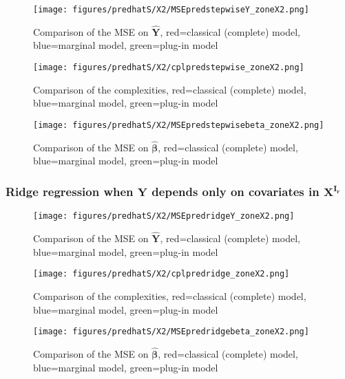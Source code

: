\documentclass[12pt,a4paper]{report}
\begin{document}
	\begin{figure}[h!]
	\centering
		  \texttt{[image: figures/predhatS/X2/MSEpredstepwiseY\_zoneX2.png]}
		\caption{Comparison of the MSE on $\hat{\boldsymbol{Y}}$, red=classical (complete) model, blue=marginal model, green=plug-in model}\label{MSEpredstepwiseY_zoneX2}
	\end{figure}
	\begin{figure}[h!]
	\centering
		  \texttt{[image: figures/predhatS/X2/cplpredstepwise\_zoneX2.png]}
		\caption{Comparison of the complexities, red=classical (complete) model, blue=marginal model, green=plug-in model}\label{cplpredstepwise_zoneX2}
	\end{figure}
	\begin{figure}[h!]
	\centering
		  \texttt{[image: figures/predhatS/X2/MSEpredstepwisebeta\_zoneX2.png]}
		\caption{Comparison of the MSE on $\hat{\boldsymbol{\beta}}$, red=classical (complete) model, blue=marginal model, green=plug-in model}\label{MSEpredstepwisebeta_zoneX2}
	\end{figure}
	\FloatBarrier
\newpage
\subsubsection{Ridge regression when $\boldsymbol{Y}$ depends only on covariates in $\boldsymbol{X^{I_r}}$}

\begin{figure}[h!]
	\centering
		  \texttt{[image: figures/predhatS/X2/MSEpredridgeY\_zoneX2.png]}
		\caption{Comparison of the MSE on $\hat{\boldsymbol{Y}}$, red=classical (complete) model, blue=marginal model, green=plug-in model}\label{MSEpredridgeY_zoneX2}
	\end{figure}
	\begin{figure}[h!]
	\centering
		  \texttt{[image: figures/predhatS/X2/cplpredridge\_zoneX2.png]}
		\caption{Comparison of the complexities, red=classical (complete) model, blue=marginal model, green=plug-in model}\label{cplpredridge_zoneX2}
	\end{figure}
	\begin{figure}[h!]
	\centering
		  \texttt{[image: figures/predhatS/X2/MSEpredridgebeta\_zoneX2.png]}
		\caption{Comparison of the MSE on $\hat{\boldsymbol{\beta}}$, red=classical (complete) model, blue=marginal model, green=plug-in model}\label{MSEpredridgebeta_zoneX2}
	\end{figure}
	\FloatBarrier
\end{document}

